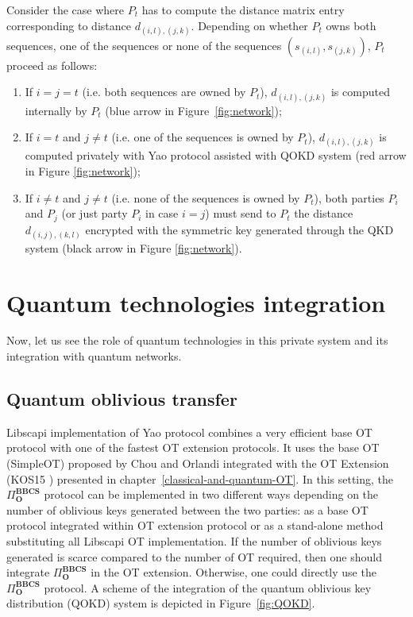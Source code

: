 Consider the case where $P_t$ has to compute the distance matrix entry corresponding to distance $d_{(i,l), (j, k)}$. Depending on whether $P_t$ owns both sequences, one of the sequences or none of the sequences $(s_{(i,l)}, s_{(j,k)})$, $P_t$ proceed as follows:

\begin{enumerate}
    \item If $i=j=t$ (i.e. both sequences are owned by $P_t$), $d_{(i,l),(j,k)}$ is computed internally by $P_t$ (blue arrow in Figure~\ref{fig:network});
    \item If $i=t$ and $j\neq t$ (i.e. one of the sequences is owned by $P_t$), $d_{(i,l),(j,k)}$ is computed privately with Yao protocol assisted with QOKD system (red arrow in Figure \ref{fig:network});
    \item If $i\neq t$ and $j\neq t$ (i.e. none of the sequences is owned by $P_t$), both parties $P_i$ and $P_j$ (or just party $P_i$ in case $i=j$) must send to $P_t$ the distance $d_{(i,j),(k,l)}$ encrypted with the symmetric key generated through the QKD system (black arrow in Figure \ref{fig:network}).
\end{enumerate}


\section{Quantum technologies integration}\label{quantumTechIntegration}

Now, let us see the role of quantum technologies in this private system and its integration with quantum networks.

\subsection{Quantum oblivious transfer} \label{quantumTechIntegQOT}

Libscapi implementation of Yao protocol combines a very efficient base OT protocol with one of the fastest OT extension protocols. It uses the base OT (SimpleOT) proposed by Chou and Orlandi \cite{CO15} integrated with the OT Extension (KOS15 \cite{KOS15}) presented in chapter~\ref{classical-and-quantum-OT}. In this setting, the $\Pi^{\textbf{BBCS}}_{\textbf{O}}$ protocol can be implemented in two different ways depending on the number of oblivious keys generated between the two parties: as a base OT protocol integrated within OT extension protocol or as a stand-alone method substituting all Libscapi OT implementation. If the number of oblivious keys generated is scarce compared to the number of OT required, then one should integrate  $\Pi^{\textbf{BBCS}}_{\textbf{O}}$ in the OT extension. Otherwise, one could directly use the  $\Pi^{\textbf{BBCS}}_{\textbf{O}}$ protocol. A scheme of the integration of the quantum oblivious key distribution (QOKD) system is depicted in Figure~\ref{fig:QOKD}.

